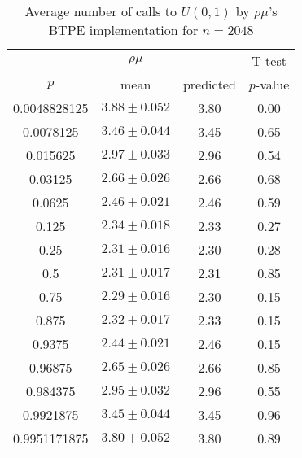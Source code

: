 \begin{table}[t]
\caption{Average number of calls to $U(0,1)$ by $\rho\mu$'s BTPE implementation for $n=2048$}
\label{tab:calls2048}
\begin{tabular}{cccc} \hline
    & $\rho\mu$ & & T-test \\
$p$ & mean & predicted & $p$-value \\ \hline
0.0048828125 & $3.88 \pm 0.052$ & 3.80 & 0.00 \\
0.0078125    & $3.46 \pm 0.044$ & 3.45 & 0.65 \\
0.015625     & $2.97 \pm 0.033$ & 2.96 & 0.54 \\
0.03125      & $2.66 \pm 0.026$ & 2.66 & 0.68 \\
0.0625       & $2.46 \pm 0.021$ & 2.46 & 0.59 \\
0.125        & $2.34 \pm 0.018$ & 2.33 & 0.27 \\
0.25         & $2.31 \pm 0.016$ & 2.30 & 0.28 \\
0.5          & $2.31 \pm 0.017$ & 2.31 & 0.85 \\
0.75         & $2.29 \pm 0.016$ & 2.30 & 0.15 \\
0.875        & $2.32 \pm 0.017$ & 2.33 & 0.15 \\
0.9375       & $2.44 \pm 0.021$ & 2.46 & 0.15 \\
0.96875      & $2.65 \pm 0.026$ & 2.66 & 0.85 \\
0.984375     & $2.95 \pm 0.032$ & 2.96 & 0.55 \\
0.9921875    & $3.45 \pm 0.044$ & 3.45 & 0.96 \\
0.9951171875 & $3.80 \pm 0.052$ & 3.80 & 0.89 \\
\hline
\end{tabular}
\end{table}

